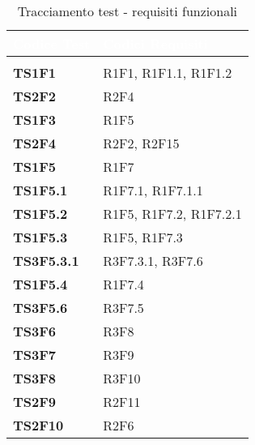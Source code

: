 \renewcommand{\arraystretch}{1.5}
\renewcommand\extrarowheight{1.5pt}
\begin{longtable}{C{2.5cm} C{10cm} } 
		\textcolor{white}{\textbf{Codice Test}} & 
		\textcolor{white}{\textbf{Codici Requisiti}} \\
		\endfirsthead
		 \\
	    \endfoot
	    \caption{Tracciamento test - requisiti funzionali}
	    \endlastfoot
		\hline
		\textbf{TS1F1} & R1F1, R1F1.1, R1F1.2 \\
		\textbf{TS2F2} & R2F4 \\
		\textbf{TS1F3} & R1F5 \\
		\textbf{TS2F4} & R2F2, R2F15 \\
		\textbf{TS1F5} &  R1F7 \\
		\textbf{TS1F5.1} & R1F7.1, R1F7.1.1 \\
		\textbf{TS1F5.2} & R1F5, R1F7.2, R1F7.2.1 \\
		\textbf{TS1F5.3} &  R1F5, R1F7.3\\
		\textbf{TS3F5.3.1} & R3F7.3.1, R3F7.6 \\
		\textbf{TS1F5.4} & R1F7.4 \\
		\textbf{TS3F5.6} & R3F7.5 \\
		\textbf{TS3F6} & R3F8 \\
		\textbf{TS3F7} & R3F9 \\
		\textbf{TS3F8} & R3F10 \\
		\textbf{TS2F9} & R2F11 \\
		\textbf{TS2F10} & R2F6 
\end{longtable}